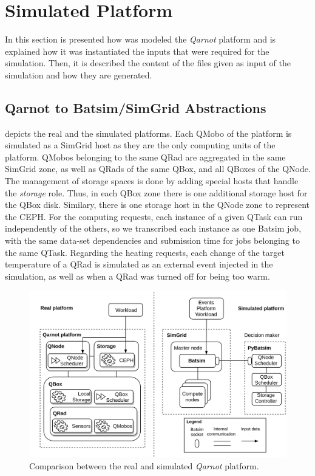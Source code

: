 \chapter{Simulated Platform}
\label{sec:simulated_platform}

In this section is presented  how was modeled the \emph{Qarnot} platform and is explained how it was instantiated the inputs that were required for the simulation. Then, it is described the content of the files given as input of the simulation and how they are generated.

\section{Qarnot to Batsim/SimGrid Abstractions}

 depicts the real and the simulated platforms.
Each QMobo of the platform is simulated as a SimGrid host as they are the only computing units of the platform. QMobos belonging to the same QRad are aggregated in the same SimGrid zone, as well as QRads of the same QBox, and all QBoxes of the QNode.
The management of storage spaces is done by adding special hosts that handle the \emph{storage} role. Thus, in each QBox zone there is one additional storage host for the QBox disk. Similary, there is one storage host in the QNode zone to represent the CEPH.
For the computing requests, each instance of a given QTask can run independently of the others, so we transcribed each instance as one Batsim job, with the same data-set dependencies and submission time for jobs belonging to the same QTask.
Regarding the heating requests, each change of the target temperature of a QRad is simulated as an external event injected in the simulation, as well as when a QRad was turned off for being too warm.

\begin{figure} [h] %
    \centering
    \includegraphics[width=1\textwidth]{images/platform-translation.png}
    \caption{Comparison between the real and simulated \emph{Qarnot} platform.}
    \label{fig:PlatformTranslation}
\end{figure}

